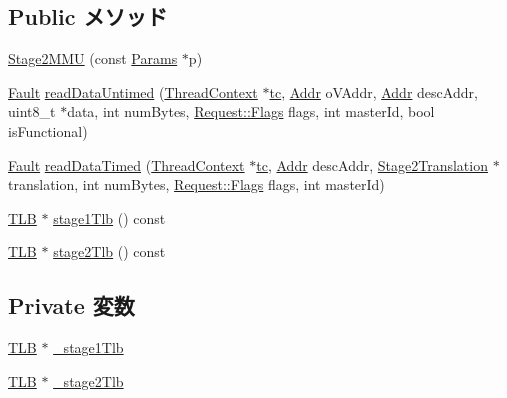 \subsection*{Public メソッド}
\begin{DoxyCompactItemize}
\item 
\hyperlink{classArmISA_1_1Stage2MMU_a2ba240fe5b46f673d59a1472ea2fba90}{Stage2MMU} (const \hyperlink{classArmISA_1_1Stage2MMU_a50e2496d982576d92f9f4df1918b73e0}{Params} $\ast$p)
\item 
\hyperlink{classRefCountingPtr}{Fault} \hyperlink{classArmISA_1_1Stage2MMU_ac040aef55a7ff520560957793f33f2d0}{readDataUntimed} (\hyperlink{classThreadContext}{ThreadContext} $\ast$\hyperlink{namespaceArmISA_a5aff829af55e65b802d83dfcef4e9dd0}{tc}, \hyperlink{classm5_1_1params_1_1Addr}{Addr} oVAddr, \hyperlink{classm5_1_1params_1_1Addr}{Addr} descAddr, uint8\_\-t $\ast$data, int numBytes, \hyperlink{classFlags}{Request::Flags} flags, int masterId, bool isFunctional)
\item 
\hyperlink{classRefCountingPtr}{Fault} \hyperlink{classArmISA_1_1Stage2MMU_a3798cb9b2fe75e8f40a2d2810824dd12}{readDataTimed} (\hyperlink{classThreadContext}{ThreadContext} $\ast$\hyperlink{namespaceArmISA_a5aff829af55e65b802d83dfcef4e9dd0}{tc}, \hyperlink{classm5_1_1params_1_1Addr}{Addr} descAddr, \hyperlink{classArmISA_1_1Stage2MMU_1_1Stage2Translation}{Stage2Translation} $\ast$translation, int numBytes, \hyperlink{classFlags}{Request::Flags} flags, int masterId)
\item 
\hyperlink{classArmISA_1_1TLB}{TLB} $\ast$ \hyperlink{classArmISA_1_1Stage2MMU_a88fa1d7ae56b4e726bf33cafc3d336a0}{stage1Tlb} () const 
\item 
\hyperlink{classArmISA_1_1TLB}{TLB} $\ast$ \hyperlink{classArmISA_1_1Stage2MMU_a17482b0222f72379826534d4b65e9195}{stage2Tlb} () const 
\end{DoxyCompactItemize}
\subsection*{Private 変数}
\begin{DoxyCompactItemize}
\item 
\hyperlink{classArmISA_1_1TLB}{TLB} $\ast$ \hyperlink{classArmISA_1_1Stage2MMU_a33806b31f50f905dd9894ed27cd04958}{\_\-stage1Tlb}
\item 
\hyperlink{classArmISA_1_1TLB}{TLB} $\ast$ \hyperlink{classArmISA_1_1Stage2MMU_a8bb6ae753189e6ef8ad755ff214a0dcd}{\_\-stage2Tlb}
\end{DoxyCompactItemize}


